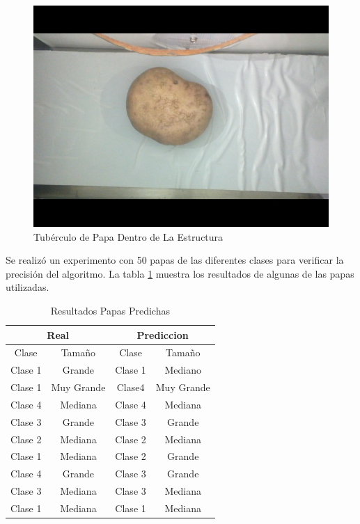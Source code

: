 	\begin{figure}[ht]
		\centering
		\includegraphics[scale=0.2]{Figs/implementacion.jpg}
		\caption{Tubérculo de Papa Dentro de La Estructura}
		\label{fig:implementacion}
	\end{figure}

	Se realizó un experimento con 50 papas de las diferentes clases para verificar la precisión del algoritmo. La tabla \ref{table:res} muestra los resultados de algunas de las papas utilizadas.
	
	\begin{table}[ht]
		\centering
		\begin{tabular}{|cc|cc|}
			\hline
			\multicolumn{2}{|c|}{Real}                 & \multicolumn{2}{c|}{Prediccion}           \\ \hline
			\multicolumn{1}{|c|}{Clase}   & Tamaño     & \multicolumn{1}{c|}{Clase}   & Tamaño     \\ \hline
			\multicolumn{1}{|c|}{Clase 1} & Grande     & \multicolumn{1}{c|}{Clase 1} & Mediano    \\ \hline
			\multicolumn{1}{|c|}{Clase 1} & Muy Grande & \multicolumn{1}{c|}{Clase4}  & Muy Grande \\ \hline
			\multicolumn{1}{|c|}{Clase 4} & Mediana    & \multicolumn{1}{c|}{Clase 4} & Mediana    \\ \hline
			\multicolumn{1}{|c|}{Clase 3} & Grande     & \multicolumn{1}{c|}{Clase 3} & Grande     \\ \hline
			\multicolumn{1}{|c|}{Clase 2} & Mediana    & \multicolumn{1}{c|}{Clase 2} & Mediana    \\ \hline
			\multicolumn{1}{|c|}{Clase 1} & Mediana    & \multicolumn{1}{c|}{Clase 2} & Grande     \\ \hline
			\multicolumn{1}{|c|}{Clase 4} & Grande     & \multicolumn{1}{c|}{Clase 3} & Grande     \\ \hline
			\multicolumn{1}{|c|}{Clase 3} & Mediana    & \multicolumn{1}{c|}{Clase 3} & Mediana    \\ \hline
			\multicolumn{1}{|c|}{Clase 1} & Mediana    & \multicolumn{1}{c|}{Clase 1} & Mediana    \\ \hline
		\end{tabular}
		\caption{Resultados Papas Predichas}
		\label{table:res}
	\end{table}
	
